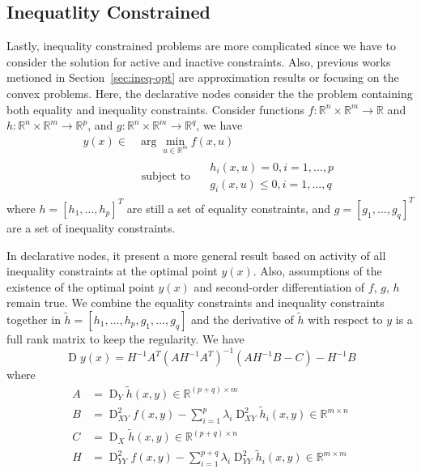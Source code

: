 \subsection{Inequatlity Constrained}
Lastly, inequality constrained problems are more complicated since we have to consider the solution for active and inactive constraints. Also, previous works metioned in Section~\ref{sec:ineq-opt} are approximation results or focusing on the convex problems. Here, the declarative nodes consider the the problem containing both equality and inequality constraints. Consider functions $f: \mathbb{R}^n \times \mathbb{R}^m \rightarrow \mathbb{R}$ and $h: \mathbb{R}^n \times \mathbb{R}^m \rightarrow \mathbb{R}^p$, and $g: \mathbb{R}^n \times \mathbb{R}^m \rightarrow \mathbb{R}^q$, we have
\begin{equation}
    \begin{aligned} 
        y(x) \in & \arg \min _{u \in \mathbb{R}^{m}} f(x, u) \\ & \text { subject to } \quad\begin{array}{l}h_{i}(x, u)=0, i=1, \ldots, p \\ g_{i}(x, u) \leq 0, i=1, \ldots, q\end{array}
    \end{aligned}
\end{equation}
where $h = [h_1, \dots, h_p]^T$ are still a set of equality constraints, and $g = [g_1, \dots, g_q]^T$ are a set of inequality constraints. 
\par In declarative nodes, it present a more general result based on activity of all inequality constraints at the optimal point $y(x)$. Also, assumptions of the existence of the optimal point $y(x)$ and second-order differentiation of $f$, $g$, $h$ remain true. We combine the equality constraints and inequality constraints together in $\tilde{h} = [h_1, \dots, h_p, g_1, \dots, g_q]$ and the derivative of $\tilde{h}$ with respect to $y$ is a full rank matrix to keep the regularity. We have
$$
\operatorname{D} y(x)=H^{-1} A^{T}\left(A H^{-1} A^{T}\right)^{-1}\left(A H^{-1} B-C\right)-H^{-1} B
$$
where
$$
\begin{aligned} 
    A &=\operatorname{D}_{Y} \tilde{h}(x, y) \in \mathbb{R}^{(p+q) \times m} \\ B &=\operatorname{D}_{X Y}^{2} f(x, y)-\sum_{i=1}^{p} \lambda_{i} \operatorname{D}_{X Y}^{2} \tilde{h}_{i}(x, y) \in \mathbb{R}^{m \times n} \\ C &=\operatorname{D}_{X} \tilde{h}(x, y) \in \mathbb{R}^{(p+q) \times n} \\ H &=\operatorname{D}_{Y Y}^{2} f(x, y)-\sum_{i=1}^{p+q} \lambda_{i} \operatorname{D}_{Y Y}^{2} \tilde{h}_{i}(x, y) \in \mathbb{R}^{m \times m} 
\end{aligned}
$$

